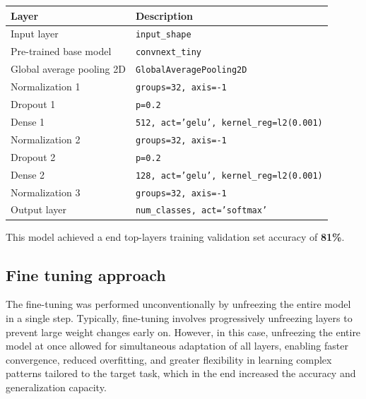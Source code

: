 \documentclass[11pt]{article}
\begin{document}
\begin{multicols}{2}
        \begin{table}[H]
            \centering
            \small
            \begin{tabular}{|l|p{3.9cm}|}
                \hline
                \textbf{Layer} & \textbf{Description} \\ \hline
                Input layer & \texttt{input\_shape} \\ \hline
                Pre-trained base model & \texttt{convnext\_tiny} \\ \hline
                Global average pooling 2D & \texttt{GlobalAveragePooling2D} \\ \hline
                Normalization 1 & \texttt{groups=32, axis=-1} \\ \hline
                Dropout 1 & \texttt{p=0.2} \\ \hline
                Dense 1 & \texttt{512, act='gelu', kernel\_reg=l2(0.001)} \\ \hline
                Normalization 2 & \texttt{groups=32, axis=-1} \\ \hline
                Dropout 2 & \texttt{p=0.2} \\ \hline
                Dense 2 & \texttt{128, act='gelu', kernel\_reg=l2(0.001)} \\ \hline
                Normalization 3 & \texttt{groups=32, axis=-1} \\ \hline
                Output layer & \texttt{num\_classes, act='softmax'} \\ \hline
            \end{tabular}
        \end{table}
        
        This model achieved a end top-layers training validation set accuracy of \textbf{81\%}.
        
        \subsection{Fine tuning approach}
        
        The fine-tuning was performed unconventionally by unfreezing the entire model in a single step.
        Typically, fine-tuning involves progressively unfreezing layers to prevent large weight changes early on.
        However, in this case, unfreezing the entire model at once allowed for simultaneous adaptation of all layers, enabling faster convergence, reduced overfitting, and greater flexibility in learning complex patterns tailored to the target task, which in the end increased the accuracy and generalization capacity.
        

\end{multicols}
\end{document}
